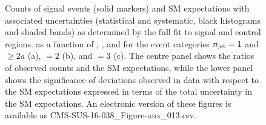 \begin{figure}
\begin{center}
  \caption{Counts of signal events (solid markers) and SM expectations
    with associated uncertainties (statistical and systematic, black
    histograms and shaded bands) 
    as determined by the full fit to signal and control regions.
    as a function of \nb, \scalht, and \mht for the event categories
	    $n_{\text{jet}} = 1$ and ${\geq}2a$ (a), $=2$ (b), and $=3$ (c).
    The centre panel shows the ratios of
    observed counts and the SM expectations, while the lower panel
    shows the significance of deviations observed in data with respect
    to the SM expectations expressed in terms of the total uncertainty
    in the SM expectations.
    An electronic version of these figures is available as CMS-SUS-16-038\_Figure-aux\_013.csv.
    }
        \label{fig:T1qqqqLL_full-fit_123}
    \end{center}
\end{figure}


